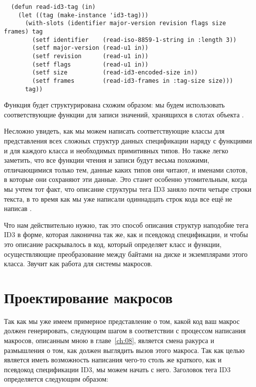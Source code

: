 \begin{lstlisting}
  (defun read-id3-tag (in)
    (let ((tag (make-instance 'id3-tag)))
      (with-slots (identifier major-version revision flags size frames) tag
        (setf identifier    (read-iso-8859-1-string in :length 3))
        (setf major-version (read-u1 in))
        (setf revision      (read-u1 in))
        (setf flags         (read-u1 in))
        (setf size          (read-id3-encoded-size in))
        (setf frames        (read-id3-frames in :tag-size size)))
      tag))
\end{lstlisting}

Функция  будет структурирована схожим образом: мы будем использовать
соответствующие функции  для записи значений, хранящихся в слотах объекта
.

Несложно увидеть, как мы можем написать соответствующие классы для представления всех
сложных структур данных спецификации наряду с функциями  и 
для каждого класса и необходимых примитивных типов. Но также легко заметить, что все
функции чтения и записи будут весьма похожими, отличающимися только тем, данные каких
типов они читают, и именами слотов, в которые они сохраняют эти данные. Это станет
особенно утомительным, когда мы учтем тот факт, что описание структуры тега ID3 заняло
почти четыре строки текста, в то время как мы уже написали одиннадцать строк кода все ещё
не написав .

Что нам действительно нужно, так это способ описания структур наподобие тега ID3 в форме,
которая лаконична так же, как и псевдокод спецификации, и чтобы это описание раскрывалось
в код, который определяет класс  и функции, осуществляющие преобразование
между байтами на диске и экземплярами этого класса. Звучит как работа для системы
макросов.

\section{Проектирование макросов}

Так как мы уже имеем примерное представление о том, какой код ваш макрос должен
генерировать, следующим шагом в соответствии с процессом написания макросов, описанным
мною в главе~\ref{ch:08}, является смена ракурса и размышления о том, как должен выглядить
вызов этого макроса. Так как целью является иметь возможность написания чего-то столь же
краткого, как и псевдокод спецификации ID3, мы можем начать с него. Заголовок тега ID3
определяется следующим образом:


